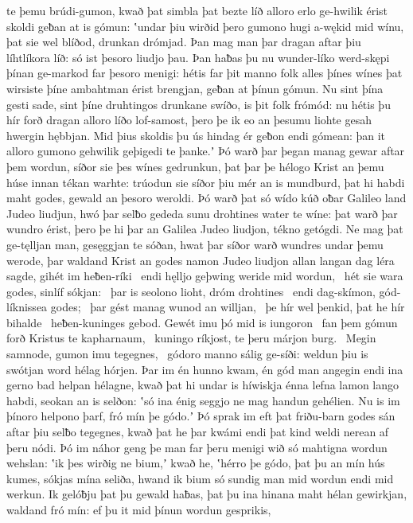 te þemu brúdi-gumon, kwað þat simbla þat bezte líð
alloro erlo ge-hwilik érist skoldi
geƀan at is gómun: ʽundar þiu wirðid þero gumono hugi
a-wękid mid wínu, þat sie wel blíðod,
drunkan drómjad. Þan mag man þar dragan aftar þiu
líhtlíkora líð: só ist þesoro liudjo þau.
Þan haƀas þu nu wunder-líko werd-skępi þínan
ge-markod far þesoro menigi: hétis far þit manno folk
alles þínes wínes þat wirsiste
þíne ambahtman érist brengjan,
geƀan at þínun gómun. Nu sint þína gesti sade,
sint þíne druhtingos drunkane swíðo,
is þit folk frómód: nu hétis þu hír forð dragan
alloro líðo lof-samost, þero þe ik eo an þesumu liohte gesah
hwergin hębbjan. Mid þius skoldis þu ús hindag ér
geƀon endi gómean: þan it alloro gumono gehwilik
geþigedi te þanke.ʼ Þó warð þar þegan manag
gewar aftar þem wordun, síðor sie þes wínes gedrunkun,
þat þar þe hélogo Krist an þemu húse innan
tékan warhte: trúodun sie síðor
þiu mér an is mundburd, þat hi habdi maht godes,
gewald an þesoro weroldi. Þó warð þat só wído kúð
oƀar Galileo land Judeo liudjun,
hwó þar selƀo gededa sunu drohtines
water te wíne: þat warð þar wundro érist,
þero þe hi þar an Galilea Judeo liudjon,
tékno getógdi. Ne mag þat ge-tęlljan man,
gesęggjan te sóðan, hwat þar síðor warð
wundres undar þemu werode, þar waldand Krist
an godes namon Judeo liudjon
allan langan dag léra sagde,
gihét im heƀen-ríki \hld\ endi hęlljo geþwing
weride mid wordun, \hld\ hét sie wara godes,
sinlíf sókjan: \hld\ þar is seolono lioht,
dróm drohtines \hld\ endi dag-skímon,
gód-líknissea godes; \hld\ þar gést manag
wunod an willjan, \hld\ þe hír wel þenkid,
þat he hír bihalde \hld\ heƀen-kuninges gebod.
Gewét imu þó mid is iungoron \hld\ fan þem gómun forð
Kristus te kapharnaum, \hld\ kuningo ríkjost,
te þeru márjon burg. \hld\ Megin samnode,
gumon imu tegegnes, \hld\ gódoro manno
sálig ge-síði: weldun þiu is swótjan word
hélag hórjen. Þar im én hunno kwam,
én gód man angegin endi ina gerno bad
helpan hélagne, kwað þat hi undar is híwiskja
énna lefna lamon lango habdi,
seokan an is selðon: ʽsó ina énig seggjo ne mag
handun gehélien. Nu is im þínoro helpono þarf,
fró mín þe gódo.ʼ Þó sprak im eft þat friðu-barn godes
sán aftar þiu selƀo tegegnes,
kwað þat he þar kwámi endi þat kind weldi
nerean af þeru nódi. Þó im náhor geng
þe man far þeru menigi wið só mahtigna
wordun wehslan: ʽik þes wirðig ne bium,ʼ kwað he,
ʽhérro þe gódo, þat þu an mín hús kumes,
sókjas mína seliða, hwand ik bium só sundig man
mid wordun endi mid werkun. Ik gelóƀju þat þu gewald haƀas,
þat þu ina hinana maht hélan gewirkjan,
waldand fró mín: ef þu it mid þínun wordun gesprikis,
